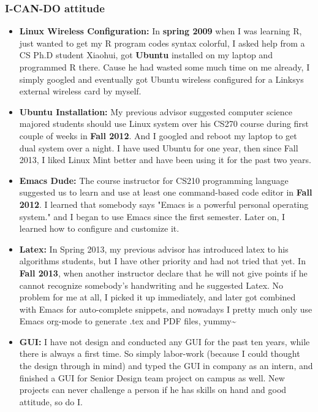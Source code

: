 \documentclass[9pt,b5paper]{article}
\begin{document}
\subsubsection{I-CAN-DO attitude}
\label{sec-8-1-2}
\begin{itemize}
\item \textbf{Linux Wireless Configuration:} In \textbf{spring 2009} when I was learning R, just wanted to get my R program codes syntax colorful, I asked help from a CS Ph.D student Xiaohui, got \textbf{Ubuntu} installed on my laptop and programmed R there. Cause he had wasted some much time on me already, I simply googled and eventually got Ubuntu wireless configured for a Linksys external wireless card by myself.
\item \textbf{Ubuntu Installation:} My previous advisor suggested computer science majored students should use Linux system over his CS270 course during first couple of weeks in \textbf{Fall 2012}. And I googled and reboot my laptop to get dual system over a night. I have used Ubuntu for one year, then since Fall 2013, I liked Linux Mint better and have been using it for the past two years.
\item \textbf{Emacs Dude:} The course instructor for CS210 programming language suggested us to learn and use at least one command-based code editor in \textbf{Fall 2012}. I learned that somebody says "Emacs is a powerful personal operating system." and I began to use Emacs since the first semester. Later on, I learned how to configure and customize it.
\item \textbf{Latex:} In Spring 2013, my previous advisor has introduced latex to his algorithms students, but I have other priority and had not tried that yet. In \textbf{Fall 2013}, when another instructor declare that he will not give points if he cannot recognize somebody's handwriting and he suggested Latex. No problem for me at all, I picked it up immediately, and later got combined with Emacs for auto-complete snippets, and nowadays I pretty much only use Emacs org-mode to generate .tex and PDF files, yummy\textasciitilde{}~
\item \textbf{GUI:} I have not design and conducted any GUI for the past ten years, while there is always a first time. So simply labor-work (because I could thought the design through in mind) and typed the GUI in company as an intern, and finished a GUI for Senior Design team project on campus as well. New projects can never challenge a person if he has skills on hand and good attitude, so do I.
\end{itemize}
\end{document}
